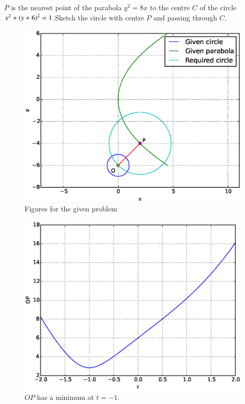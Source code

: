 \documentclass[journal,12pt,twocolumn]{IEEEtran}
\begin{document}
\begin{problem}
$P$ is the nearest point of the parabola $y^2=8x$ to the centre $C$ of the circle $x^2+\left(y+6\right)^2=1$.Sketch the circle with centre $P$ and passing through $C$.
\end{problem}
\solution


\renewcommand{\thefigure}{\theproblem.\arabic{figure}}
\begin{figure}[h]
\centering
\includegraphics[width=\columnwidth]{./figs/ee16b1037a}
\caption{ Figures for the given problem}
\end{figure}
%
\begin{figure}[h]
\centering
\includegraphics[width=\columnwidth]{./figs/ee16b1037b}
\caption{ $OP$ has a minimum at $t = -1$.}
\end{figure}
\end{document}

